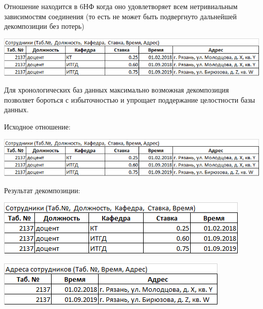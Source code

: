 \documentclass{beamer}
\begin{document}
\begin{frame}
\begin{block}{Отношение находится в 6НФ}
когда оно удовлетворяет всем нетривиальным зависимостям соединения (то есть не может быть подвергнуто дальнейшей декомпозиции без потерь)
\end{block}
\begin{center}
\includegraphics[scale=0.6]{images/ex-rasp-25.png}
\end{center}
Для хронологических баз данных максимально возможная декомпозиция позволяет бороться с избыточностью и упрощает поддержание целостности базы данных. 
\end{frame}

\begin{frame}
Исходное отношение:
\begin{center}
\includegraphics[scale=0.6]{images/ex-rasp-25.png}
\end{center}
Результат декомпозиции:
\begin{center}
\includegraphics[scale=0.6]{images/ex-rasp-26.png}
\end{center}
\begin{center}
\includegraphics[scale=0.6]{images/ex-rasp-27.png}
\end{center}
\end{frame}
\end{document}
